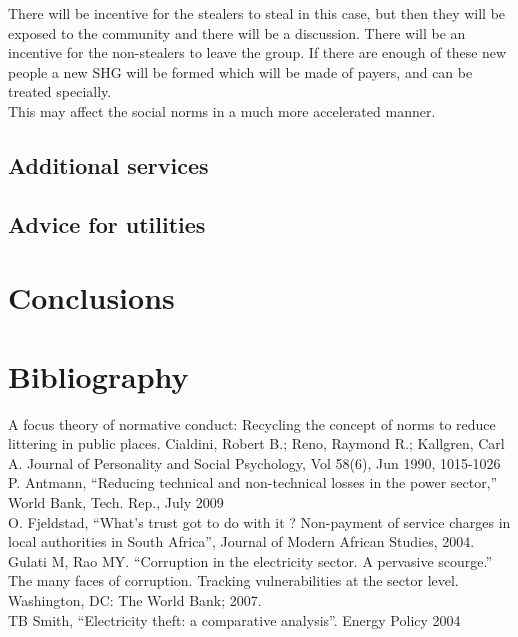 \documentclass{article}
\begin{document}
There will be incentive for the stealers to steal in this case, but then they will be exposed to the community and there will be a discussion. There will be an incentive for the non-stealers to leave the group. If there are enough of these new people a new SHG will be formed which will be made of payers, and can be treated specially.\\

This may affect the social norms in a much more accelerated manner.\\ 

\subsection{Additional services}

\subsection{Advice for utilities}

\section{Conclusions}
\section{Bibliography}

A focus theory of normative conduct: Recycling the concept of norms to reduce littering in public places.
Cialdini, Robert B.; Reno, Raymond R.; Kallgren, Carl A.
Journal of Personality and Social Psychology, Vol 58(6), Jun 1990, 1015-1026\\

P. Antmann, “Reducing technical and non-technical losses in the power sector,” World Bank, Tech. Rep., July 2009\\

O. Fjeldstad, “What’s trust got to do with it ? Non-payment of service charges in local authorities in South Africa”, Journal of Modern African Studies, 2004.\\

Gulati M, Rao MY. “Corruption in the electricity sector. A pervasive scourge.” The many faces of corruption. Tracking vulnerabilities at the sector level. Washington, DC: The World Bank; 2007.\\

TB Smith, “Electricity theft: a comparative analysis”. Energy Policy 2004\\
\end{document}
